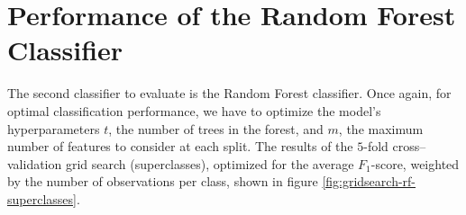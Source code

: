 \section{Performance of the Random Forest Classifier}

The second classifier to evaluate is the Random Forest classifier. Once again, for optimal classification performance, we have to optimize the model's hyperparameters $t$, the number of trees in the forest, and $m$, the maximum number of features to consider at each split. The results of the $5$-fold cross--validation grid search (superclasses), optimized for the average $F_1$-score, weighted by the number of observations per class, shown in figure \ref{fig:gridsearch-rf-superclasses}.

\begin{figure}[H]
\hfill
{}
\hfill
{}

\end{figure}
